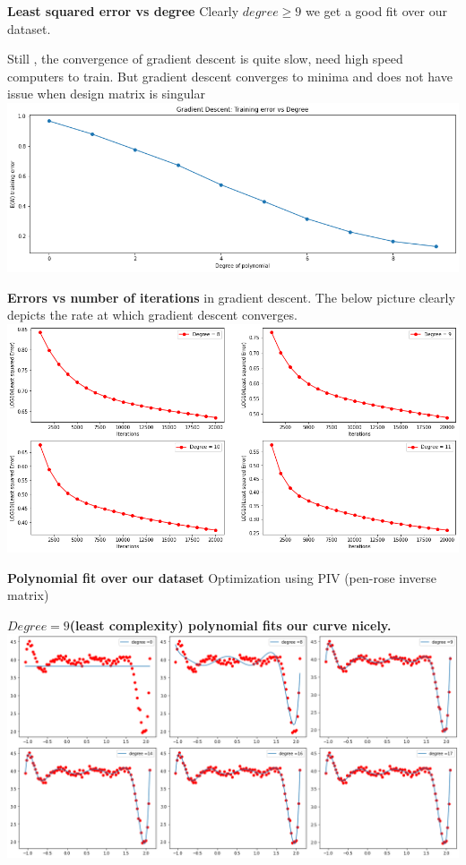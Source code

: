 \documentclass[11pt]{beamer}
\begin{document}
\begin{frame}
\textbf{Least squared  error vs degree}
Clearly $degree \geq 9 $ we get a good fit over our dataset.

Still , the convergence of gradient descent is quite slow, need high speed computers to train. But gradient descent converges to minima and does not have issue when design matrix is singular
\includegraphics[scale=0.27]{images/35.png}
\end{frame}

\begin{frame}
\textbf{Errors vs number of iterations} in gradient descent. The below picture clearly depicts the rate at which gradient descent converges.
\includegraphics[scale=0.3]{images/36.png}
\end{frame}


\begin{frame}
\textbf{Polynomial fit over our dataset} 
Optimization using PIV (pen-rose inverse matrix)


\textbf{$Degree=9$(least complexity) polynomial fits our curve nicely.}
\includegraphics[scale=0.28]{images/14.png}


\end{frame}
\end{document}
